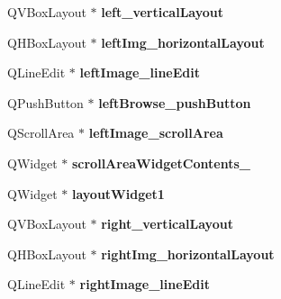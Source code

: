 \begin{DoxyCompactItemize}
\item 
\hypertarget{classUi__QcorrClass_ae7eb5196b5e392a40fa3e3a77f40c3cc}{
QVBoxLayout $\ast$ {\bfseries left\_\-verticalLayout}}
\label{classUi__QcorrClass_ae7eb5196b5e392a40fa3e3a77f40c3cc}

\item 
\hypertarget{classUi__QcorrClass_aaad53db0cbf018c38d75aebbe78959b3}{
QHBoxLayout $\ast$ {\bfseries leftImg\_\-horizontalLayout}}
\label{classUi__QcorrClass_aaad53db0cbf018c38d75aebbe78959b3}

\item 
\hypertarget{classUi__QcorrClass_a12d1c71e330c76e65484418502338a31}{
QLineEdit $\ast$ {\bfseries leftImage\_\-lineEdit}}
\label{classUi__QcorrClass_a12d1c71e330c76e65484418502338a31}

\item 
\hypertarget{classUi__QcorrClass_ae05243dcb19bfd6fd6d1c3257f25338a}{
QPushButton $\ast$ {\bfseries leftBrowse\_\-pushButton}}
\label{classUi__QcorrClass_ae05243dcb19bfd6fd6d1c3257f25338a}

\item 
\hypertarget{classUi__QcorrClass_acb12117880660e7d8fec35de7eee51c6}{
QScrollArea $\ast$ {\bfseries leftImage\_\-scrollArea}}
\label{classUi__QcorrClass_acb12117880660e7d8fec35de7eee51c6}

\item 
\hypertarget{classUi__QcorrClass_aab5ae2e7dc3baefb6ada5e1a758e826f}{
QWidget $\ast$ {\bfseries scrollAreaWidgetContents\_}}
\label{classUi__QcorrClass_aab5ae2e7dc3baefb6ada5e1a758e826f}

\item 
\hypertarget{classUi__QcorrClass_a24caba38fd151a2ab5b577b1425bd07c}{
QWidget $\ast$ {\bfseries layoutWidget1}}
\label{classUi__QcorrClass_a24caba38fd151a2ab5b577b1425bd07c}

\item 
\hypertarget{classUi__QcorrClass_a232c26905d00f6608b8ba97a6546daa0}{
QVBoxLayout $\ast$ {\bfseries right\_\-verticalLayout}}
\label{classUi__QcorrClass_a232c26905d00f6608b8ba97a6546daa0}

\item 
\hypertarget{classUi__QcorrClass_a6885fe1dcc883e2f927c2fb943b206e0}{
QHBoxLayout $\ast$ {\bfseries rightImg\_\-horizontalLayout}}
\label{classUi__QcorrClass_a6885fe1dcc883e2f927c2fb943b206e0}

\item 
\hypertarget{classUi__QcorrClass_a690e51bd7f4916ca89f876f39afee05d}{
QLineEdit $\ast$ {\bfseries rightImage\_\-lineEdit}}
\label{classUi__QcorrClass_a690e51bd7f4916ca89f876f39afee05d}


\end{DoxyCompactItemize}
